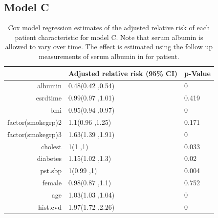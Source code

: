 \documentclass[paper=a4, fontsize=11pt]{scrartcl} %
\numberwithin{equation}{section} %
\numberwithin{figure}{section} %
\numberwithin{table}{section} %
\begin{document}
\subsection{Model C}
\begin{table}[H]
\centering
\begin{tabular}{rll}
  \hline
 & Adjusted relative risk (95\% CI) & p-Value \\ 
  \hline
albumin & 0.48(0.42 ,0.54) & 0 \\ 
  esrdtime & 0.99(0.97 ,1.01) & 0.419 \\ 
  bmi & 0.95(0.94 ,0.97) & 0 \\ 
  factor(smokegrp)2 & 1.1(0.96 ,1.25) & 0.171 \\ 
  factor(smokegrp)3 & 1.63(1.39 ,1.91) & 0 \\ 
  cholest & 1(1 ,1) & 0.033 \\ 
  diabetes & 1.15(1.02 ,1.3) & 0.02 \\ 
  pst.sbp & 1(0.99 ,1) & 0.004 \\ 
  female & 0.98(0.87 ,1.1) & 0.752 \\ 
  age & 1.03(1.03 ,1.04) & 0 \\ 
  hist.cvd & 1.97(1.72 ,2.26) & 0 \\ 
   \hline
\end{tabular}
\caption{Cox model regression estimates of the adjusted relative risk of each patient characteristic for model C. Note that serum albumin is allowed to vary over time. The effect is estimated using the follow up measurements of serum albumin in for patient.}
\label{tab:model_c}
\end{table}
\end{document}
